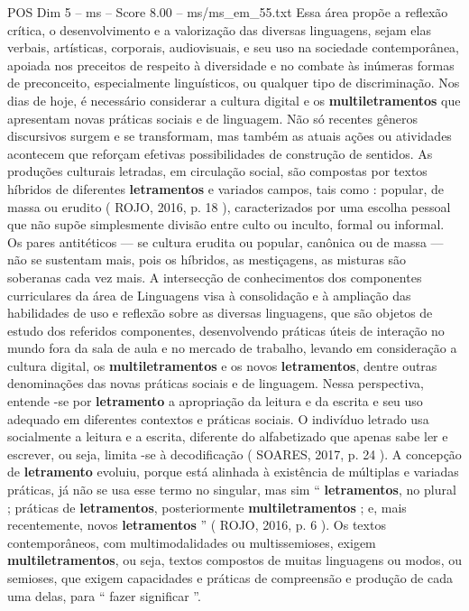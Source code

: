 \begin{textsample}{POS Dim 5 – ms – Score 8.00 – ms/ms\_em\_55.txt}
Essa área propõe a reflexão crítica, o desenvolvimento e a valorização das diversas linguagens, sejam elas verbais, artísticas, corporais, audiovisuais, e seu uso na sociedade contemporânea, apoiada nos preceitos de respeito à diversidade e no combate às inúmeras formas de preconceito, especialmente linguísticos, ou qualquer tipo de discriminação.
Nos dias de hoje, é necessário considerar a cultura digital e os \textbf{multiletramentos} que apresentam novas práticas sociais e de linguagem.
Não só recentes gêneros discursivos surgem e se transformam, mas também as atuais ações ou atividades acontecem que reforçam efetivas possibilidades de construção de sentidos.
As produções culturais letradas, em circulação social, são compostas por textos híbridos de diferentes \textbf{letramentos} e variados campos, tais como : popular, de massa ou erudito ( ROJO, 2016, p. 18 ), caracterizados por uma escolha pessoal que não supõe simplesmente divisão entre culto ou inculto, formal ou informal.
Os pares antitéticos — se cultura erudita ou popular, canônica ou de massa — não se sustentam mais, pois os híbridos, as mestiçagens, as misturas são soberanas cada vez mais.
A intersecção de conhecimentos dos componentes curriculares da área de Linguagens visa à consolidação e à ampliação das habilidades de uso e reflexão sobre as diversas linguagens, que são objetos de estudo dos referidos componentes, desenvolvendo práticas úteis de interação no mundo fora da sala de aula e no mercado de trabalho, levando em consideração a cultura digital, os \textbf{multiletramentos} e os novos \textbf{letramentos}, dentre outras denominações das novas práticas sociais e de linguagem.
Nessa perspectiva, entende -se por \textbf{letramento} a apropriação da leitura e da escrita e seu uso adequado em diferentes contextos e práticas sociais.
O indivíduo letrado usa socialmente a leitura e a escrita, diferente do alfabetizado que apenas sabe ler e escrever, ou seja, limita -se à decodificação ( SOARES, 2017, p. 24 ).
A concepção de \textbf{letramento} evoluiu, porque está alinhada à existência de múltiplas e variadas práticas, já não se usa esse termo no singular, mas sim “ \textbf{letramentos}, no plural ; práticas de \textbf{letramentos}, posteriormente \textbf{multiletramentos} ; e, mais recentemente, novos \textbf{letramentos} ” ( ROJO, 2016, p. 6 ).
Os textos contemporâneos, com multimodalidades ou multissemioses, exigem \textbf{multiletramentos}, ou seja, textos compostos de muitas linguagens ou modos, ou semioses, que exigem capacidades e práticas de compreensão e produção de cada uma delas, para “ fazer significar ”.

\end{textsample}
